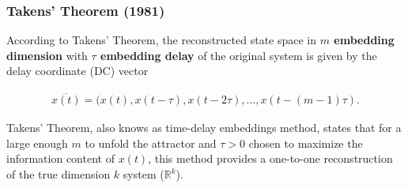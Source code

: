 \documentclass{beamer}
\theoremstyle{definition}
\newtheorem*{dfn}{Definition}
\begin{document}
\begin{frame}
\frametitle{Takens' Theorem (1981)}


According to Takens' Theorem, the reconstructed state space
in  \textbf{$m$ embedding dimension} with  \textbf{ $\tau$ embedding delay}
of the original system is given by the delay coordinate (DC) vector

\begin{eqnarray*} 
\overline{x(t)} = (x(t), x(t - \tau), x(t-2\tau), ... , x (t-(m-1)\tau).
\end{eqnarray*}
 
Takens' Theorem, also knows as time-delay embeddings method, states
that for a large enough $m$ to unfold the attractor and $\tau > 0$ 
chosen to maximize the information
content of $x(t)$, this method provides a 
one-to-one reconstruction
of the true dimension $k$ system ($\mathbb{R}^k$).





% 
% 


\end{frame}
\end{document}
